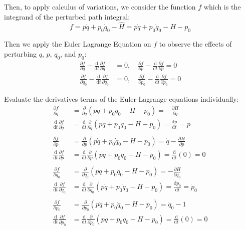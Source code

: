 \documentclass[titlepage]{article}
\begin{document}
Then, to apply calculus of variations, we consider the function $f$ which is the integrand of the perturbed path integral:
\begin{equation}
	f=p\dot{q}+p_0\dot{q}_0-\hat{H}=p\dot{q}+p_0\dot{q}_0-H-p_0
\end{equation}

Then we apply the Euler Lagrange Equation on $f$ to observe the effects of perturbing $q$, $p$, $q_0$, and $p_0$:
\begin{equation}
	\begin{split}
		\frac{\partial f}{\partial q}-\frac{\mathrm{d}}{\mathrm{d}t}\frac{\partial f}{\partial\dot{q}}&=0,\quad\frac{\partial f}{\partial p}-\frac{\mathrm{d}}{\mathrm{d}t}\frac{\partial f}{\partial\dot{p}}=0 \\
		\frac{\partial f}{\partial q_0}-\frac{\mathrm{d}}{\mathrm{d}t}\frac{\partial f}{\partial\dot{q}_0}&=0,\quad\frac{\partial f}{\partial p_0}-\frac{\mathrm{d}}{\mathrm{d}t}\frac{\partial f}{\partial\dot{p}_0}=0
	\end{split}
\end{equation}

Evaluate the derivatives terms of the Euler-Lagrange equations individually:
\begin{equation}
	\begin{split}
		\frac{\partial f}{\partial q}&=\frac{\partial}{\partial q}\left(p\dot{q}+p_0\dot{q}_0-H-p_0\right)=-\frac{\partial H}{\partial q} \\
		\frac{\mathrm{d}}{\mathrm{d}t}\frac{\partial f}{\partial\dot{q}}&=\frac{\mathrm{d}}{\mathrm{d}t}\frac{\partial}{\partial\dot{q}}\left(p\dot{q}+p_0\dot{q}_0-H-p_0\right)=\frac{\mathrm{d}p}{\mathrm{d}t}=\dot{p} \\
		\\
		\frac{\partial f}{\partial p}&=\frac{\partial}{\partial p}\left(p\dot{q}+p_0\dot{q}_0-H-p_0\right)=\dot{q}-\frac{\partial H}{\partial p} \\
		\frac{\mathrm{d}}{\mathrm{d}t}\frac{\partial f}{\partial\dot{p}}&=\frac{\mathrm{d}}{\mathrm{d}t}\frac{\partial}{\partial\dot{p}}\left(p\dot{q}+p_0\dot{q}_0-H-p_0\right)=\frac{\mathrm{d}}{\mathrm{d}t}(0)=0 \\
		\\
		\frac{\partial f}{\partial q_0}&=\frac{\partial}{\partial q_0}\left(p\dot{q}+p_0\dot{q}_0-H-p_0\right)=-\frac{\partial H}{\partial q_0} \\
		\frac{\mathrm{d}}{\mathrm{d}t}\frac{\partial f}{\partial\dot{q}_0}&=\frac{\mathrm{d}}{\mathrm{d}t}\frac{\partial}{\partial\dot{q}_0}\left(p\dot{q}+p_0\dot{q}_0-H-p_0\right)=\frac{\mathrm{d}p_0}{\mathrm{d}t}=\dot{p}_0 \\
		\\
		\frac{\partial f}{\partial p_0}&=\frac{\partial}{\partial p_0}\left(p\dot{q}+p_0\dot{q}_0-H-p_0\right)=\dot{q}_0-1 \\
		\frac{\mathrm{d}}{\mathrm{d}t}\frac{\partial f}{\partial\dot{p}_0}&=\frac{\mathrm{d}}{\mathrm{d}t}\frac{\partial}{\partial\dot{p}_0}\left(p\dot{q}+p_0\dot{q}_0-H-p_0\right)=\frac{\mathrm{d}}{\mathrm{d}t}(0)=0
	\end{split}
\end{equation}
\end{document}
